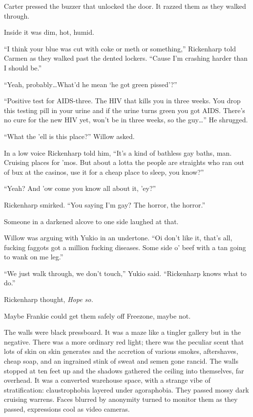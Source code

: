 Carter pressed the buzzer that unlocked the door. It razzed them as they walked through.

Inside it was dim, hot, humid.

``I think your blue was cut with coke or meth or something,'' Rickenharp told Carmen as they walked past the dented lockers. ``Cause I'm crashing harder than I should be.''

``Yeah, probably\ldots What'd he mean ‘he got green pissed'?''

``Positive test for AIDS-three. The HIV that kills you in three weeks. You drop this testing pill in your urine and if the urine turns green you got AIDS. There's no cure for the new HIV yet, won't be in three weeks, so the guy\ldots '' He shrugged.

``What the 'ell is this place?'' Willow asked.

In a low voice Rickenharp told him, ``It's a kind of bathless gay baths, man. Cruising places for 'mos. But about a lotta the people are straights who ran out of bux at the casinos, use it for a cheap place to sleep, you know?''

``Yeah? And 'ow come you know all about it, 'ey?''

Rickenharp smirked. ``You saying I'm gay? The horror, the horror.''

Someone in a darkened alcove to one side laughed at that.

Willow was arguing with Yukio in an undertone. ``Oi don't like it, that's all, fucking faggots got a million fucking diseases. Some side o' beef with a tan going to wank on me leg.''

``We just walk through, we don't touch,'' Yukio said. ``Rickenharp knows what to do.''

Rickenharp thought, \textit{Hope so.}

Maybe Frankie could get them safely off Freezone, maybe not.

The walls were black pressboard. It was a maze like a tingler gallery but in the negative. There was a more ordinary red light; there was the peculiar scent that lots of skin on skin generates and the accretion of various smokes, aftershaves, cheap soap, and an ingrained stink of sweat and semen gone rancid. The walls stopped at ten feet up and the shadows gathered the ceiling into themselves, far overhead. It was a converted warehouse space, with a strange vibe of stratification: claustrophobia layered under agoraphobia. They passed mossy dark cruising warrens. Faces blurred by anonymity turned to monitor them as they passed, expressions cool as video cameras.

